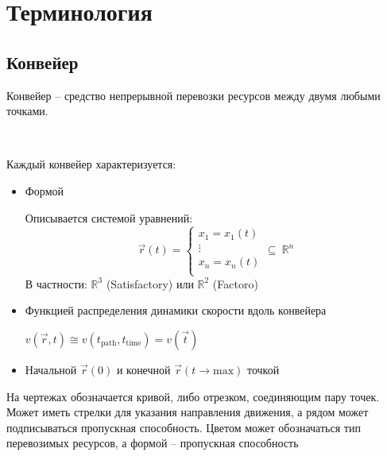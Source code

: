 \chapter{Терминология}

\section{Конвейер}

\noindent Конвейер -- средство непрерывной перевозки ресурсов между двумя любыми точками.

\

\noindent Каждый конвейер характеризуется:
\begin{itemize}
	\item Формой
	
		Описывается системой уравнений:
		$$\vec{r}(t) = \begin{cases} x_1 = x_1(t) \\ \vdots \\ x_n = x_n(t) \\ \end{cases} \subseteq \ \mathbb{R}^n$$
		В частности: $\mathbb{R}^3$ (Satisfactory) или $\mathbb{R}^2$ (Factoro)
	
	\item Функцией распределения динамики скорости вдоль конвейера 
		
		$v(\vec{r}, t) \cong v(t_{\text{path}}, t_{\text{time}}) = v\left(\vec{t}\right)$
	
	\item Начальной $\vec{r}(0)$ и конечной $\vec{r}(t\to\text{max})$ точкой
\end{itemize}


\vspace{0.3in}


На чертежах обозначается кривой, либо отрезком, соединяющим пару точек. Может иметь стрелки для указания направления движения, а рядом может подписываться пропускная способность. Цветом может обозначаться тип перевозимых ресурсов, а формой -- пропускная способность

\vspace{0.5in}


